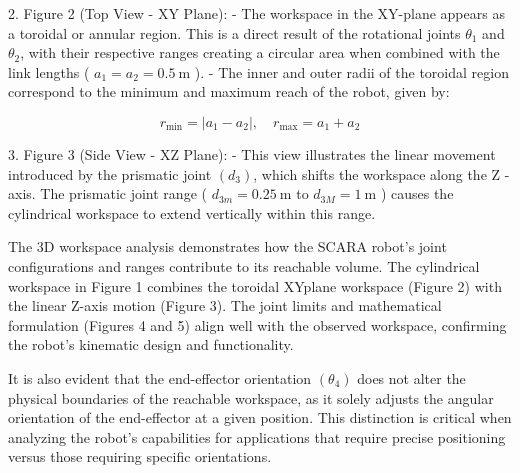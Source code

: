 \documentclass[12pt]{report}
\begin{document}
2. Figure 2 (Top View - XY Plane):
- The workspace in the XY-plane appears as a toroidal or annular region. This is a direct result of the rotational joints $\theta_1$ and $\theta_2$, with their respective ranges creating a circular area when combined with the link lengths ( $a_1=a_2=0.5 \mathrm{~m}$ ).
- The inner and outer radii of the toroidal region correspond to the minimum and maximum reach of the robot, given by:

$$
r_{\min }=\left|a_1-a_2\right|, \quad r_{\max }=a_1+a_2
$$

3. Figure 3 (Side View - XZ Plane):
- This view illustrates the linear movement introduced by the prismatic joint $\left(d_3\right)$, which shifts the workspace along the Z -axis. The prismatic joint range ( $d_{3 m}=0.25 \mathrm{~m}$ to $d_{3 M}=1 \mathrm{~m}$ ) causes the cylindrical workspace to extend vertically within this range.	 



The 3D workspace analysis demonstrates how the SCARA robot's joint configurations and ranges contribute to its reachable volume. The cylindrical workspace in Figure 1 combines the toroidal XYplane workspace (Figure 2) with the linear Z-axis motion (Figure 3). The joint limits and mathematical formulation (Figures 4 and 5) align well with the observed workspace, confirming the robot's kinematic design and functionality.

It is also evident that the end-effector orientation $\left(\theta_4\right)$ does not alter the physical boundaries of the reachable workspace, as it solely adjusts the angular orientation of the end-effector at a given position. This distinction is critical when analyzing the robot's capabilities for applications that require precise positioning versus those requiring specific orientations.
\end{document}
